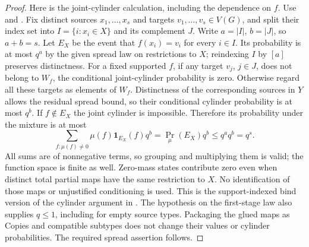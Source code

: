 \begin{proof}
Here is the joint-cylinder calculation, including the dependence on $f$.
Use  and . Fix distinct
sources $x_1,\ldots,x_s$ and targets $v_1,\ldots,v_s\in V(G)$, and split
their index set into $I=\{i:x_i\in X\}$ and its complement $J$.
Write $a=|I|$, $b=|J|$, so $a+b=s$. Let $E_X$ be the event that
$f(x_i)=v_i$ for every $i\in I$. Its probability is at most $q^a$ by the
given spread law on restrictions to $X$; reindexing $I$ by $[a]$ preserves
distinctness. For a fixed supported $f$, if any target $v_j$, $j\in J$,
does not belong to $W_f$, the conditional joint-cylinder probability is
zero. Otherwise regard all these targets as elements of $W_f$. Distinctness
of the corresponding sources in $Y$ allows the residual spread bound,
so their conditional cylinder probability is at most $q^b$.
If $f\notin E_X$ the joint cylinder is impossible. Therefore its probability
under the mixture is at most
\[
 \sum_{f:\mu(f)\ne0}\mu(f)\mathbf1_{E_X}(f)q^b
 =\Pr_\mu(E_X)q^b\leq q^a q^b=q^s.
\]
All sums are of nonnegative terms, so grouping and multiplying them is valid;
the function space is finite as well. Zero-mass states contribute zero even
when distinct total partial maps have the same restriction to $X$. No
identification of those maps or unjustified conditioning is used. This is
the support-indexed bind version of the cylinder argument in
. The hypothesis on the first-stage law
also supplies $q\leq1$, including for empty source types. Packaging the
glued maps as Copies and compatible subtypes does not change their values
or cylinder probabilities. The required spread assertion follows.
\end{proof}
